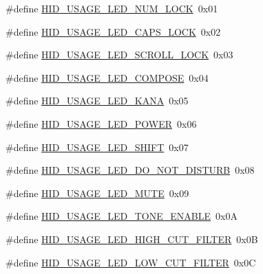 \begin{DoxyCompactItemize}
\item 
\#define \hyperlink{group___u_s_b_d___h_i_d_ga36ce120868adf30bbd161bb7dc158381}{H\+I\+D\+\_\+\+U\+S\+A\+G\+E\+\_\+\+L\+E\+D\+\_\+\+N\+U\+M\+\_\+\+L\+O\+CK}~0x01
\item 
\#define \hyperlink{group___u_s_b_d___h_i_d_gae6f37265467778fb821c13aacfb874f4}{H\+I\+D\+\_\+\+U\+S\+A\+G\+E\+\_\+\+L\+E\+D\+\_\+\+C\+A\+P\+S\+\_\+\+L\+O\+CK}~0x02
\item 
\#define \hyperlink{group___u_s_b_d___h_i_d_ga65d50a5eda9c4d5664052d524d362aa4}{H\+I\+D\+\_\+\+U\+S\+A\+G\+E\+\_\+\+L\+E\+D\+\_\+\+S\+C\+R\+O\+L\+L\+\_\+\+L\+O\+CK}~0x03
\item 
\#define \hyperlink{group___u_s_b_d___h_i_d_ga24e2ff6f63b971ae8ac48b2fa0c4a3e2}{H\+I\+D\+\_\+\+U\+S\+A\+G\+E\+\_\+\+L\+E\+D\+\_\+\+C\+O\+M\+P\+O\+SE}~0x04
\item 
\#define \hyperlink{group___u_s_b_d___h_i_d_ga0358c17c119b7b06e426eaf9c165c51c}{H\+I\+D\+\_\+\+U\+S\+A\+G\+E\+\_\+\+L\+E\+D\+\_\+\+K\+A\+NA}~0x05
\item 
\#define \hyperlink{group___u_s_b_d___h_i_d_ga0fc37c52b98493e8624b79cd4ba38069}{H\+I\+D\+\_\+\+U\+S\+A\+G\+E\+\_\+\+L\+E\+D\+\_\+\+P\+O\+W\+ER}~0x06
\item 
\#define \hyperlink{group___u_s_b_d___h_i_d_gaa6ef098f1cb5963537ab9fe7cc270d98}{H\+I\+D\+\_\+\+U\+S\+A\+G\+E\+\_\+\+L\+E\+D\+\_\+\+S\+H\+I\+FT}~0x07
\item 
\#define \hyperlink{group___u_s_b_d___h_i_d_ga82d00da266c3f871bc2336baeb101418}{H\+I\+D\+\_\+\+U\+S\+A\+G\+E\+\_\+\+L\+E\+D\+\_\+\+D\+O\+\_\+\+N\+O\+T\+\_\+\+D\+I\+S\+T\+U\+RB}~0x08
\item 
\#define \hyperlink{group___u_s_b_d___h_i_d_gad7c327bb6d5f71b16aa1823220d74254}{H\+I\+D\+\_\+\+U\+S\+A\+G\+E\+\_\+\+L\+E\+D\+\_\+\+M\+U\+TE}~0x09
\item 
\#define \hyperlink{group___u_s_b_d___h_i_d_gad2bd4321ce65e012ab24b7e1cbb7ae64}{H\+I\+D\+\_\+\+U\+S\+A\+G\+E\+\_\+\+L\+E\+D\+\_\+\+T\+O\+N\+E\+\_\+\+E\+N\+A\+B\+LE}~0x0A
\item 
\#define \hyperlink{group___u_s_b_d___h_i_d_gae28056389c74cec9b970183d9e2853e0}{H\+I\+D\+\_\+\+U\+S\+A\+G\+E\+\_\+\+L\+E\+D\+\_\+\+H\+I\+G\+H\+\_\+\+C\+U\+T\+\_\+\+F\+I\+L\+T\+ER}~0x0B
\item 
\#define \hyperlink{group___u_s_b_d___h_i_d_ga2ca4f7cb4ce5ab8e3e8c78a5a65449bd}{H\+I\+D\+\_\+\+U\+S\+A\+G\+E\+\_\+\+L\+E\+D\+\_\+\+L\+O\+W\+\_\+\+C\+U\+T\+\_\+\+F\+I\+L\+T\+ER}~0x0C
\item 

\end{DoxyCompactItemize}
